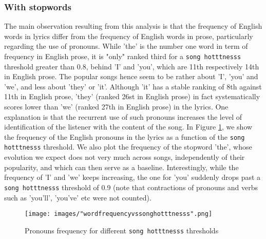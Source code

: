 \documentclass[11pt]{article}
\renewcommand\_{\textunderscore\allowbreak}
\begin{document}
\subsubsection{With stopwords}
The main observation resulting from this analysis is that the frequency of English words in lyrics differ from the frequency of English words in prose, particularly regarding the use of pronouns.
While 'the' is the number one word in term of frequency in English prose, it is "only" ranked third for a \texttt{song hotttnesss} threshold greater than 0.8, behind 'I' and 'you', which are 11th respectively 14th in English prose.
The popular songs hence seem to be rather about 'I', 'you' and 'we', and less about 'they' or 'it'.
Although 'it' has a stable ranking of 8th against 11th in English prose, 'they' (ranked 26st in English prose) in fact systematically scores lower than 'we' (ranked 27th in English prose) in the lyrics.
One explanation is that the recurrent use of such pronouns increases the level of identification of the listener with the content of the song.
In Figure \ref{fig:word_frequency_stopwords}, we show the frequency of the English pronouns in the lyrics as a function of the \texttt{song hotttnesss} threshold.
We also plot the frequency of the stopword 'the', whose evolution we expect does not very much across songs, independently of their popularity, and which can then serve as a baseline.
Interestingly, while the frequency of 'I' and 'we' keeps increasing, the one for 'you' suddenly drops past a \texttt{song hotttnesss} threshold of 0.9 (note that contractions of pronouns and verbs such as 'you'll', 'you've' etc were not counted).

\begin{figure}[h!]
\centering
\captionsetup{width=1.0\textwidth}
\texttt{[image: images/"word\_frequency\_vs\_song\_hotttnesss".png]}
\caption{Pronouns frequency for different \texttt{song hotttnesss} thresholds}
\label{fig:word_frequency_stopwords}
\end{figure}
\end{document}
